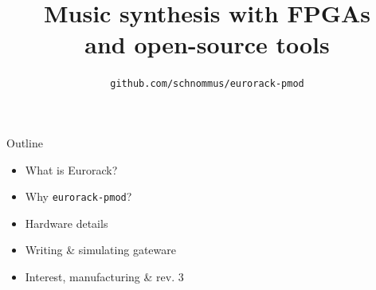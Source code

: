 \documentclass{beamer}
\title{Music synthesis with FPGAs \\and open-source tools}
\subtitle{}
\author{\texttt{github.com/schnommus/eurorack-pmod}}
\institute{Sebastian Holzapfel}
\date{}
\begin{document}
\maketitle

\setwatermark{}








\begin{frame}{Outline}


    \begin{itemize}
        \item What is Eurorack?
        \item Why \texttt{eurorack-pmod}?
        \item Hardware details
        \item Writing \& simulating gateware
        \item Interest, manufacturing \& rev. 3
    \end{itemize}

\end{frame}
\end{document}

